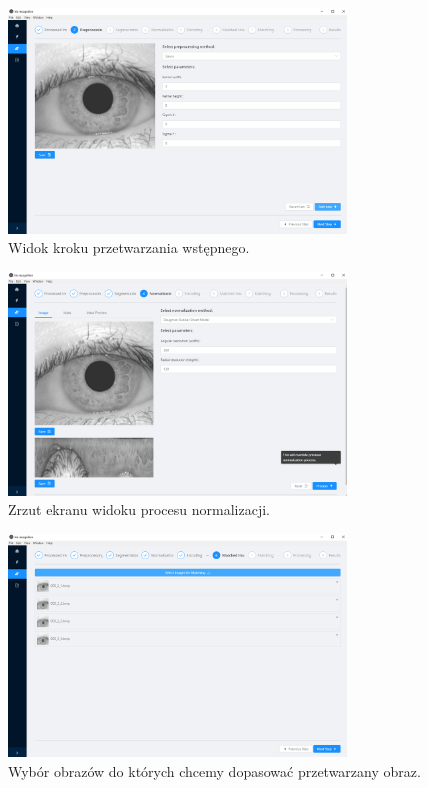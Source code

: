 \begin{figure}[ht]
  \centering
  \includegraphics[width=0.8\textwidth]{images/app/preprocessing.png}
  \caption{Widok kroku przetwarzania wstępnego.}
  \label{fig:preprocessingScreen}
\end{figure}

\begin{figure}[ht]
  \centering
  \includegraphics[width=0.8\textwidth]{images/app/normalization.png}
  \caption{Zrzut ekranu widoku procesu normalizacji.}
  \label{fig:normScreen}
\end{figure}

\begin{figure}[ht]
  \centering
  \includegraphics[width=0.8\textwidth]{images/app/matchingImages.png}
  \caption{Wybór obrazów do których chcemy dopasowa\'c przetwarzany obraz.}
  \label{fig:matchingImagesScreen}
\end{figure}

